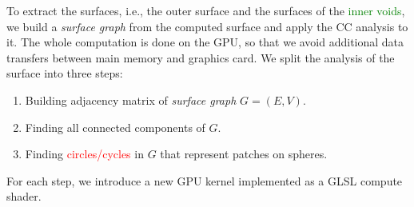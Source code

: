 To extract the surfaces, i.e., the outer surface and the surfaces of the \textcolor{green}{inner voids}, we build a \textit{surface graph} from the computed surface and apply the CC analysis to it.
The whole computation is done on the GPU, so that we avoid additional data transfers between main memory and graphics card.
We split the analysis of the surface into three steps:
\begin{enumerate}
  \item Building adjacency matrix of \textit{surface graph} $G = (E, V)$.
	\item Finding all connected components of $G$.
	\item Finding \textcolor{red}{circles/cycles} in $G$ that represent patches on spheres.
\end{enumerate}
For each step, we introduce a new GPU kernel implemented as a GLSL compute shader.

